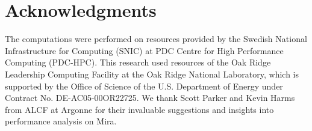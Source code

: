 \documentclass{sig-alternate}
\begin{document}
\section{Acknowledgments}
The computations were performed on resources provided by the Swedish National 
Infrastructure for Computing (SNIC) at PDC Centre for High Performance Computing (PDC-HPC).
This research used resources of the Oak Ridge Leadership Computing Facility at 
the Oak Ridge National Laboratory, which is supported by the Office of Science of 
the U.S. Department of Energy under Contract No. DE-AC05-00OR22725. 
We thank Scott Parker and Kevin Harms from ALCF at Argonne for their invaluable
suggestions and insights into performance analysis on Mira. 
%

%
%

\vskip 40pt
\begin{flushright}
\scriptsize {} \normalsize
\end{flushright}
\end{document}

